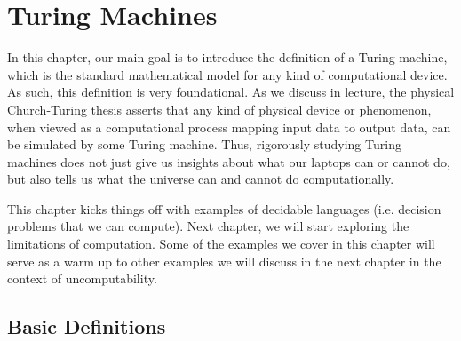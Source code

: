 

\chapter{Turing Machines}
\label{chapter:Turing-Machines}

\begin{preamble}
In this chapter, our main goal is to introduce the definition of a Turing machine, which is the standard mathematical model for any kind of computational device. As such, this definition is very foundational. As we discuss in lecture, the physical Church-Turing thesis asserts that any kind of physical device or phenomenon, when viewed as a computational process mapping input data to output data, can be simulated by some Turing machine. Thus, rigorously studying Turing machines does not just give us insights about what our laptops can or cannot do, but also tells us what the universe can and cannot do computationally. 

This chapter kicks things off with examples of decidable languages (i.e. decision problems that we can compute). Next chapter, we will start exploring the limitations of computation. Some of the examples we cover in this chapter will serve as a warm up to other examples we will discuss in the next chapter in the context of uncomputability.
\end{preamble}



\section{Basic Definitions}


